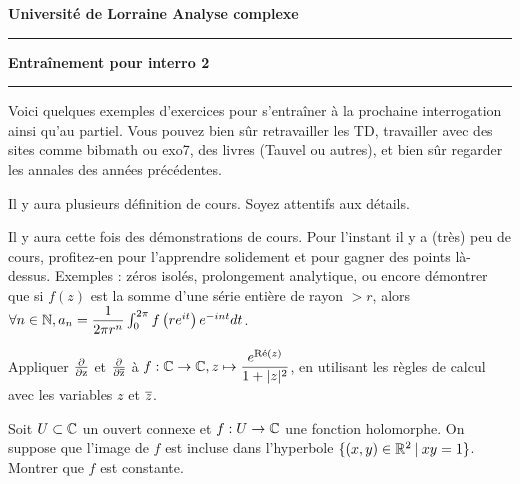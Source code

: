 











\newpage
\noindent \textbf{\textsf{Université de Lorraine \hfill Analyse complexe}}
\smallskip
\noindent\rule{\textwidth}{2pt}
\begin{center}
{\huge \textbf{Entraînement pour interro 2}}
\end{center}
\noindent\rule{\textwidth}{2pt}

Voici quelques exemples d'exercices pour s'entraîner à la prochaine interrogation ainsi qu'au partiel. Vous pouvez bien sûr retravailler les TD, travailler avec des sites comme bibmath ou exo7, des livres (Tauvel ou autres), et bien sûr regarder les annales des années précédentes.

\begin{exo}
Il y aura plusieurs définition de cours. Soyez attentifs aux détails.
\end{exo}

\begin{exo}
Il y aura cette fois des démonstrations de cours. Pour l'instant il y a (très) peu de cours, profitez-en pour l'apprendre solidement et pour gagner des points là-dessus. Exemples : zéros isolés, prolongement analytique, ou encore démontrer que si $f(z)$ est la somme d'une série entière de rayon  $>r$, alors $\forall n\in\N,  a_n = \dfrac{1}{2\pi r^n}\int_0^{2\pi} f\left(re^{it}\right)e^{-int}dt$.
\end{exo}

\begin{exo}
Appliquer $\del$ et $\delbarre$ à $f : \C\to\C, z\mapsto \dfrac{e^{\PR(z)}}{1+|z|^2}$, en utilisant les règles de calcul avec les variables $z$ et $\z$.
\end{exo}

\begin{exo}
Soit $U\subset \C$ un ouvert connexe et $f : U\to \C$ une fonction holomorphe.
On suppose que l'image de $f$ est incluse dans l'hyperbole $\{(x,y)\in \R^2\:|\: xy=1\}$.
Montrer que $f$ est constante.
\end{exo}

